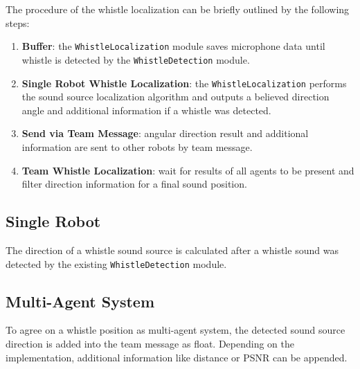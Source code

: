 The procedure of the whistle localization can be briefly outlined by
the following steps:
\begin{enumerate}
      \item \textbf{Buffer}: the \lstinline!WhistleLocalization! module saves microphone
            data until whistle is detected by the \lstinline!WhistleDetection! module.
      \item \textbf{Single Robot Whistle Localization}: the \lstinline!WhistleLocalization!
            performs the sound source localization algorithm and outputs a
            believed direction angle and additional information if a whistle was detected.
      \item \textbf{Send via Team Message}: angular direction result and additional information
            are sent to other robots by team message.
      \item \textbf{Team Whistle Localization}: wait for results of all agents to be present
            and filter direction information for a final sound position.
\end{enumerate}


\subsection{Single Robot}
\label{subsec:03_singleRobot}

The direction of a whistle sound source is calculated after a whistle sound was detected
by the existing \lstinline!WhistleDetection! module.

\subsection{Multi-Agent System}
\label{subsec:03_multiAgend}

To agree on a whistle position as multi-agent system, the detected sound source
direction is added into the team message as float.
Depending on the implementation, additional information like distance or
\ac{PSNR} can be appended.

